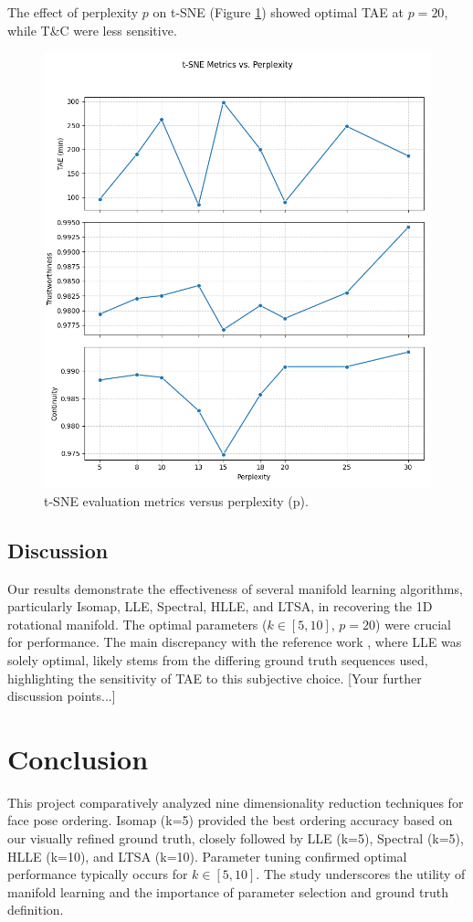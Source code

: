 \documentclass{article}
\begin{document}
The effect of perplexity $p$ on t-SNE (Figure \ref{fig:tuning_p}) showed optimal TAE at $p=20$, while T\&C were less sensitive.

\begin{figure}[htbp]
  \centering
  \includegraphics[width=0.7\linewidth]{../figs/tuning_p.png}
  \caption{t-SNE evaluation metrics versus perplexity (p).}
  \label{fig:tuning_p}
\end{figure}

\subsection{Discussion}
Our results demonstrate the effectiveness of several manifold learning algorithms, particularly Isomap, LLE, Spectral, HLLE, and LTSA, in recovering the 1D rotational manifold. The optimal parameters ($k \in [5, 10]$, $p=20$) were crucial for performance. The main discrepancy with the reference work \citep{CSIC5011_RefReport}, where LLE was solely optimal, likely stems from the differing ground truth sequences used, highlighting the sensitivity of TAE to this subjective choice. [Your further discussion points...]

\section{Conclusion}
\label{sec:conclusion}
This project comparatively analyzed nine dimensionality reduction techniques for face pose ordering. Isomap (k=5) provided the best ordering accuracy based on our visually refined ground truth, closely followed by LLE (k=5), Spectral (k=5), HLLE (k=10), and LTSA (k=10). Parameter tuning confirmed optimal performance typically occurs for $k \in [5, 10]$. The study underscores the utility of manifold learning and the importance of parameter selection and ground truth definition.

\FloatBarrier %
\nocite{*}
\end{document}
